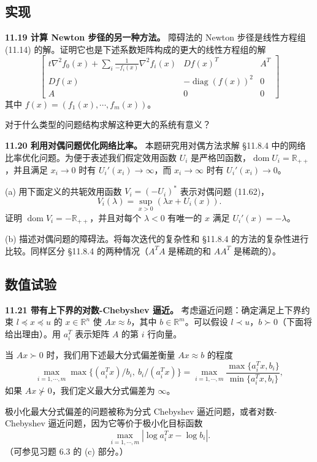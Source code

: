 \documentclass[UTF8, 12pt, fontset=fandol, oneside]{ctexart}
\begin{document}
\subsection*{实现}

\noindent\textbf{11.19 计算 Newton 步径的另一种方法。} 障碍法的 Newton 步径是线性方程组 (11.14) 的解。证明它也是下述系数矩阵构成的更大的线性方程组的解
\[
\begin{bmatrix}
t\nabla^2 f_0(x)+\displaystyle\sum_i\frac{1}{-f_i(x)}\nabla^2 f_i(x) & Df(x)^T & A^T\\
Df(x) & -\operatorname{diag}(f(x))^2 & 0\\
A & 0 & 0
\end{bmatrix}
\]
其中 $f(x)=(f_1(x),\cdots,f_m(x))$。

对于什么类型的问题结构求解这种更大的系统有意义？

\noindent\textbf{11.20 利用对偶问题优化网络比率。} 本题研究用对偶方法求解 \S11.8.4 中的网络比率优化问题。为便于表述我们假定效用函数 $U_i$ 是严格凹函数，$\operatorname{dom}U_i=\mathbb{R}_{++}$，并且满足 $x_i\to 0$ 时有 $U_i'(x_i)\to\infty$，而 $x_i\to\infty$ 时有 $U_i'(x_i)\to 0$。

(a) 用下面定义的共轭效用函数 $V_i=(-U_i)^\ast$ 表示对偶问题 (11.62)，
\[
V_i(\lambda)=\sup_{x>0}(\lambda x+U_i(x)).
\]
证明 $\operatorname{dom}V_i=-\mathbb{R}_{++}$，并且对每个 $\lambda<0$ 有唯一的 $x$ 满足 $U_i'(x)=-\lambda$。

(b) 描述对偶问题的障碍法。将每次迭代的复杂性和 \S11.8.4 的方法的复杂性进行比较。同样区分 \S11.8.4 的两种情况（$A^TA$ 是稀疏的和 $AA^T$ 是稀疏的）。

\subsection*{数值试验}

\noindent\textbf{11.21 带有上下界的对数-Chebyshev 逼近。} 考虑逼近问题：确定满足上下界约束 $l\preceq x\preceq u$ 的 $x\in\mathbb{R}^n$ 使 $Ax\approx b$，其中 $b\in\mathbb{R}^m$。可以假设 $l\prec u$，$b\succ 0$（下面将给出理由）。用 $a_i^T$ 表示矩阵 $A$ 的第 $i$ 行向量。

当 $Ax\succ 0$ 时，我们用下述最大分式偏差衡量 $Ax\approx b$ 的程度
\[
\max_{i=1,\cdots,m}\max\{(a_i^Tx)/b_i,\ b_i/(a_i^Tx)\}
=
\max_{i=1,\cdots,m}\frac{\max\{a_i^Tx,b_i\}}{\min\{a_i^Tx,b_i\}},
\]
如果 $Ax\not\succ 0$，我们定义最大分式偏差为 $\infty$。

极小化最大分式偏差的问题被称为分式 Chebyshev 逼近问题，或者对数-Chebyshev 逼近问题，因为它等价于极小化目标函数
\[
\max_{i=1,\cdots,m}|\log a_i^Tx-\log b_i|.
\]
（可参见习题 6.3 的 (c) 部分。）
\end{document}
